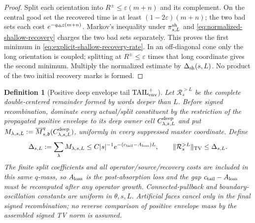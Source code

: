 \documentclass[11pt]{article}
\newtheorem{definition}[theorem]{Definition}
\begin{document}
\begin{proof}
Split each orientation into $R^\pm\le\varepsilon(m+n)$ and its complement.
On the central good set the recovered time is at least
$(1-2\varepsilon)(m+n)$; the two bad sets each cost
$e^{-q_{\rm sh}\varepsilon(m+n)}$.  Markov's inequality under
$\pi^{\rm sh}_{s,L}$ and
\eqref{eq:normalized-shallow-recovery} charges the two bad sets separately.
This proves the first minimum in
\eqref{eq:explicit-shallow-recovery-rate}.  In an off-diagonal cone only the
long orientation is coupled; splitting at $R^\pm\le\varepsilon$ times that
long coordinate gives the second minimum.  Multiply the normalized estimate
by $\Delta_{\rm sh}(s,L)$.  No product of the two initial recovery marks is
formed.
\end{proof}

\begin{definition}[Positive deep envelope tail
$\mathrm{TAIL}_{\rm env}^{+}$]
\label{def:deep-envelope-tail}
Let $\mathcal R_s^{>L}$ be the complete double-centered remainder formed by
words deeper than $L$.  Before signed recombination, dominate every
actual/split constituent by the restriction of the propagated positive
envelope to its deep owner cell $C_{\lambda,s,L}^{\rm deep}$ and put
$M_{\lambda,s,L}:=
\overline M_{s,\mathfrak d}^{q}(C_{\lambda,s,L}^{\rm deep})$, uniformly in
every suppressed master coordinate.  Define
\begin{equation}
\label{eq:deep-positive-envelope-mass}
 \Delta_{s,L}:=\sum_\lambda M_{\lambda,s,L}
 \le C|s|^{-1}e^{-(c_{\rm tail}-A_{\rm loss})L},
 \qquad
 \|\mathcal R_s^{>L}\|_{\rm TV}\le\Delta_{s,L}.
\end{equation}
The finite split coefficients and all operator/source/recovery costs are
included in this same $q$-mass, so $A_{\rm loss}$ is the post-absorption
loss and the gap $c_{\rm tail}-A_{\rm loss}$ must be recomputed after any
operator growth.  Connected-pullback
and boundary-oscillation constants are uniform in $\theta,s,L$.
Artificial faces cancel only in the final signed recombination; no reverse
comparison of positive envelope mass by the assembled signed TV norm is
assumed.
\end{definition}
\end{document}
